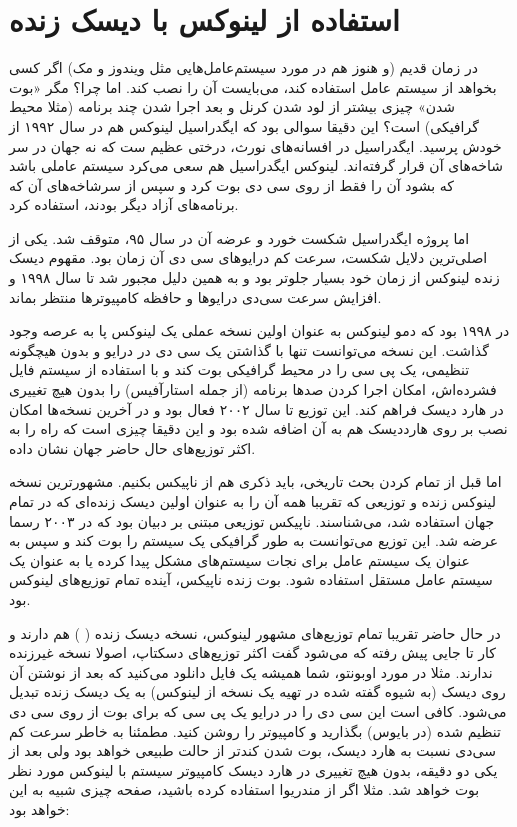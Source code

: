 \section{استفاده از لینوکس با دیسک زنده}
در زمان قدیم (و هنوز هم در مورد سیستم‌عامل‌هایی مثل ویندوز و مک) اگر کسی بخواهد از سیستم عامل استفاده کند، می‌بایست آن را نصب کند. اما چرا؟ مگر «بوت شدن» چیزی بیشتر از لود شدن کرنل و بعد اجرا شدن چند برنامه (مثلا محیط گرافیکی) است؟ این دقیقا سوالی بود که ایگدراسیل لینوکس هم در سال ۱۹۹۲ از خودش پرسید. ایگدراسیل در افسانه‌های نورث، درختی عظیم ست که نه جهان در سر شاخه‌های آن قرار گرفته‌اند. لینوکس ایگدراسیل هم سعی می‌کرد سیستم عاملی باشد که بشود آن را فقط از روی سی دی بوت کرد و سپس از سرشاخه‌های آن که برنامه‌های آزاد دیگر بودند، استفاده کرد.

اما پروژه ایگدراسیل شکست خورد و عرضه آن در سال ۹۵، متوقف شد. یکی از اصلی‌ترین دلایل شکست، سرعت کم درایوهای سی دی آن زمان بود. مقهوم دیسک زنده لینوکس از زمان خود بسیار جلوتر بود و به همین دلیل مجبور شد تا سال ۱۹۹۸ و افزایش سرعت سی‌دی‌ درایوها و حافظه کامپیوترها منتظر بماند.

در ۱۹۹۸ بود که دمو لینوکس به عنوان اولین نسخه عملی یک لینوکس پا به عرصه وجود گذاشت. این نسخه می‌توانست تنها با گذاشتن یک سی دی در درایو و بدون هیچگونه تنظیمی، یک پی سی را در محیط گرافیکی بوت کند و با استفاده از سیستم فایل فشرده‌اش، امکان اجرا کردن صدها برنامه (از جمله استارآفیس) را بدون هیچ تغییری در هارد دیسک فراهم کند. این توزیع تا سال ۲۰۰۲ فعال بود و در آخرین نسخه‌ها امکان نصب بر روی هارددیسک هم به آن اضافه شده بود و این دقیقا چیزی است که راه را به اکثر توزیع‌های حال حاضر جهان نشان داده.

اما قبل از تمام کردن بحث تاریخی، باید ذکری هم از ناپیکس بکنیم. مشهورترین نسخه لینوکس زنده و توزیعی که تقریبا همه آن را به عنوان اولین دیسک زنده‌ای که در تمام جهان استفاده شد، می‌شناسند. ناپیکس توزیعی مبتنی بر دبیان بود که در ۲۰۰۳ رسما عرضه شد. این توزیع می‌توانست به طور گرافیکی یک سیستم را بوت کند و سپس به عنوان یک سیستم عامل برای نجات سیستم‌های مشکل پیدا کرده یا به عنوان یک سیستم عامل مستقل استفاده شود. بوت زنده ناپیکس،‌ آینده تمام توزیع‌های لینوکس بود.

در حال حاضر تقریبا تمام توزیع‌های مشهور لینوکس، نسخه دیسک زنده (
) هم دارند و کار تا جایی پیش رفته که می‌شود گفت اکثر توزیع‌های دسکتاپ، اصولا نسخه غیرزنده ندارند. مثلا در مورد اوبونتو، شما همیشه یک فایل 
 دانلود می‌کنید که بعد از نوشتن آن روی دیسک (به شیوه گفته شده در تهیه یک نسخه از لینوکس) به یک دیسک زنده تبدیل می‌شود. کافی است این سی دی را در درایو یک پی سی که برای بوت از روی سی دی تنظیم شده (در بایوس) بگذارید و کامپیوتر را روشن کنید. مطمئنا به خاطر سرعت کم سی‌دی نسبت به هارد دیسک، بوت شدن کندتر از حالت طبیعی خواهد بود ولی بعد از یکی دو دقیقه، بدون هیچ تغییری در هارد دیسک کامپیوتر سیستم با لینوکس مورد نظر بوت خواهد شد. مثلا اگر از مندریوا استفاده کرده باشید، صفحه چیزی شبیه به این خواهد بود:

